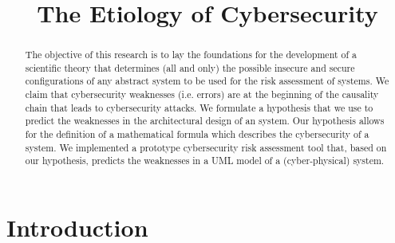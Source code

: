 \documentclass[runningheads]{llncs}
\begin{document}
\title{The Etiology of Cybersecurity}

\author{}

\authorrunning{}

\institute{}
\maketitle

\begin{abstract}
	The objective of this research is to lay the foundations for the
	development of a scientific theory that determines (all and only) the
	possible insecure and secure configurations of any abstract system to be used for the risk assessment of systems. We
	claim that cybersecurity weaknesses (i.e. errors) are at the beginning
	of the causality chain that leads to cybersecurity attacks.  We
	formulate a hypothesis that we
	use to predict the weaknesses in the architectural design of an
	system. Our
	hypothesis allows for the definition of a mathematical formula which
	describes the cybersecurity of a system.  We implemented a prototype
	cybersecurity risk assessment tool that, based on our hypothesis,
	predicts the weaknesses in a UML model of a (cyber-physical) system.
\end{abstract}


\section{Introduction}\label{sec:intro}
\end{document}
